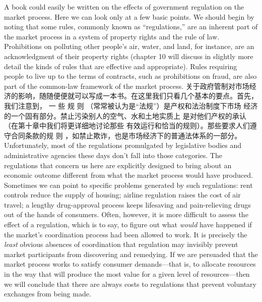 \begin{paracol}{2}
A book could easily be written on the effects of government
regulation on the market process. Here we can look only at a
few basic points. We should begin by noting that some rules,
commonly known as ``regulations,'' are an inherent part of the
market process in a system of property rights and the rule of
law. Prohibitions on polluting other people's air, water, and
land, for instance, are an acknowledgment of their property rights (chapter 10 will discuss in slightly more detail the kinds
of rules that are effective and appropriate). Rules requiring people to live up to the terms of contracts, such as prohibitions on
fraud, are also part of the common-law framework of the market process.
\switchcolumn
关于政府管制对市场经济的影响，随随便便就可以写成一本书。在这里我们只看几个基本的要点。首先，我们注意到，
一 些 规 则 （常常被认为是“法规”）是产权和法治制度下市场
经济的一个固有部分。禁止污染别人的空气、水和土地实质上
是对他们产权的承认（在第十章中我们将更详细地讨论那些
有效运行和恰当的规则）。那些要求人们遵守合同条款的规
则 ，如禁止欺诈，也是市场经济下的普通法体系的一部分。
\switchcolumn*
Unfortunately, most of the regulations promulgated by legislative bodies and administrative agencies these days don't fall
into those categories. The regulations that concern us here are
explicitly designed to bring about an economic outcome different from what the market process would have produced. Sometimes we can point to specific problems generated by such
regulations: rent controls reduce the supply of housing; airline
regulation raises the cost of air travel; a lengthy drug-approval
process keeps lifesaving and pain-relieving drugs out of the
hands of consumers. Often, however, it is more difficult to assess the effect of a regulation, which is to say, to figure out what
\textit{would} have happened if the market's coordination process had
been allowed to work. It is precisely the \textit{least} obvious absences
of coordination that regulation may invisibly prevent market
participants from discovering and remedying. If we are persuaded that the market process works to satisfy consumer demands---that is, to allocate resources in the way that will
produce the most value for a given level of resources---then we
will conclude that there are always costs to regulations that prevent voluntary exchanges from being made.
\switchcolumn

\end{paracol}
